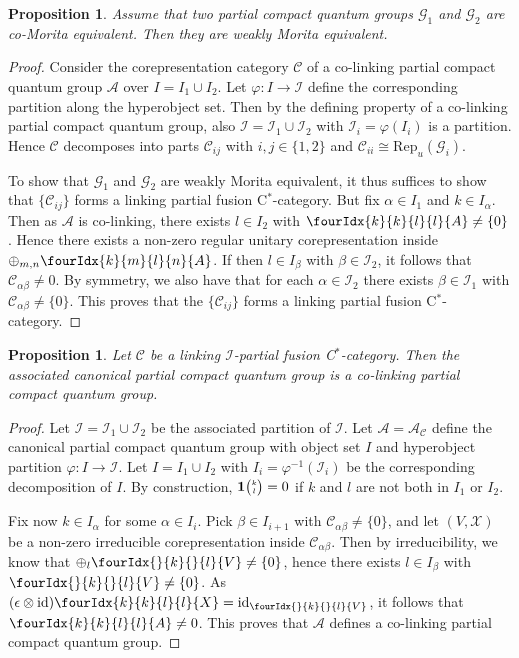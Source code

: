 \documentclass[10pt]{article}
\DeclareMathOperator{\id}{id}
\newcommand{\CatC}{\mathcal{C}}
\newcommand{\CatCC}{\mathscr{C}}
\newcommand{\Rep}{\mathrm{Rep}}
\newcommand{\Grt}[3]{#1{\tiny {\begin{pmatrix} #2\\#3\end{pmatrix}}}}
\newcommand{\UnitC}[2]{\Grt{\mathbf{1}}{#1}{#2}}
\newcommand{\Gr}[5]{\fourIdx{#2}{#4}{#3}{#5}{#1}}%
\newcommand{\Gru}[3]{\Gr{#1}{}{}{#2}{#3}}
\newtheorem{Prop}[Theorem]{Proposition}
\theoremstyle{definition}
\numberwithin{equation}{section}
\begin{document}
\begin{Prop}\label{PropCoWeak} Assume that two partial compact quantum groups $\mathscr{G}_1$ and $\mathscr{G}_2$ are co-Morita equivalent. Then they are weakly Morita equivalent.
\end{Prop} 
\begin{proof} 
Consider the corepresentation category $\CatCC$ of a co-linking partial compact quantum group $\mathscr{A}$ over $I = I_1\cup I_2$. Let $\varphi:I\rightarrow \mathscr{I}$ define the corresponding partition along the hyperobject set. Then by the defining property of a co-linking partial compact quantum group, also $\mathscr{I} = \mathscr{I}_1\cup \mathscr{I}_2$ with $\mathscr{I}_i=\varphi(I_i)$ is a partition. Hence $\CatCC$ decomposes into parts $\CatCC_{ij}$ with $i,j\in \{1,2\}$ and $\CatC_{ii}\cong \Rep_u(\mathscr{G}_i)$. 

To show that $\mathscr{G}_1$ and $\mathscr{G}_2$ are weakly Morita equivalent, it thus suffices to show that $\{\CatCC_{ij}\}$ forms a linking partial fusion C$^*$-category. But fix $\alpha\in I_1$ and $k\in I_{\alpha}$. Then as $\mathscr{A}$ is co-linking, there exists $l \in I_2$ with $\Gr{A}{k}{l}{k}{l}\neq \{0\}$. Hence there exists a non-zero regular  unitary corepresentation inside $\oplus_{m,n}\Gr{A}{k}{l}{m}{n}$. If then $l\in I_{\beta}$ with $\beta\in \mathscr{I}_2$, it follows that $\CatC_{\alpha\beta}\neq 0$. By symmetry, we also have that for each $\alpha \in \mathscr{I}_2$ there exists $\beta \in \mathscr{I}_1$ with $\CatC_{\alpha\beta}\neq \{0\}$. This proves that the $\{\CatCC_{ij}\}$ forms a linking partial fusion C$^*$-category.
\end{proof}

\begin{Prop}\label{PropCoLink} Let $\CatCC$ be a linking $\mathscr{I}$-partial fusion C$^*$-category. Then the associated canonical partial compact quantum group is a co-linking partial compact quantum group. 
\end{Prop} 

\begin{proof} Let $\mathscr{I}= \mathscr{I}_1\cup \mathscr{I}_2$ be the associated partition of $\mathscr{I}$. Let $\mathscr{A} = \mathscr{A}_{\CatCC}$ define the canonical partial compact quantum group with object set $I$ and hyperobject partition $\varphi:I\rightarrow \mathscr{I}$. Let $I=I_1\cup I_2$ with $I_i = \varphi^{-1}(\mathscr{I}_i)$ be the corresponding decomposition of $I$. By construction, $\UnitC{k}{l}=0$ if $k$ and $l$ are not both in $I_1$ or $I_2$. 

Fix now $k\in I_{\alpha}$ for some $\alpha \in I_i$. Pick $\beta\in I_{i+1}$ with $\CatC_{\alpha\beta}\neq\{0\}$, and let $(V,\mathscr{X})$ be a non-zero irreducible corepresentation inside $\CatC_{\alpha\beta}$. Then by irreducibility, we know that $\oplus_l \Gru{V}{k}{l} \neq \{0\}$, hence there exists $l\in I_{\beta}$ with $\Gru{V}{k}{l}\neq \{0\}$. As $(\epsilon\otimes \id)\Gr{X}{k}{l}{k}{l} = \id_{\Gru{V}{k}{l}}$, it follows that $\Gr{A}{k}{l}{k}{l} \neq 0$. This proves that $\mathscr{A}$ defines a co-linking partial compact quantum group.
\end{proof} 
\end{document}
